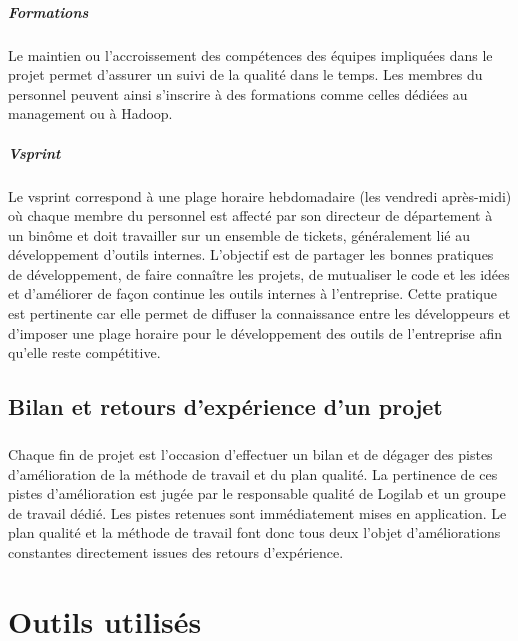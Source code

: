 \documentclass {report}
\begin{document}
\paragraph{Formations} Le maintien ou l’accroissement des compétences des équipes impliquées dans le projet permet d’assurer un suivi de la qualité dans le temps. Les membres du personnel peuvent ainsi s'inscrire à des formations comme celles dédiées au management ou à Hadoop\footnotemark[1].
\paragraph{Vsprint}
Le vsprint correspond à une plage horaire hebdomadaire (les vendredi après-midi) où chaque membre du personnel est affecté par son directeur de département à un binôme et doit travailler sur un ensemble de tickets, généralement lié au développement d'outils internes. L'objectif est de partager les bonnes pratiques de développement, de faire connaître les projets, de mutualiser le code et les idées et d'améliorer de façon continue les outils internes à l'entreprise. Cette pratique est pertinente car elle permet de diffuser la connaissance entre les développeurs et d'imposer une plage horaire pour le développement des outils de l'entreprise afin qu'elle reste compétitive.



\section{Bilan et retours d'expérience d'un projet}
\paragraph{}
Chaque fin de projet est l’occasion d’effectuer un bilan et de dégager des pistes d’amélioration de la méthode de travail et du plan qualité. La pertinence de ces pistes d’amélioration est jugée par le responsable qualité de Logilab et un groupe de travail dédié. Les pistes retenues sont immédiatement mises en application. Le plan qualité et la méthode de travail font donc tous deux l’objet d’améliorations constantes directement issues des retours d’expérience.

\chapter{Outils utilisés}
\end{document}
